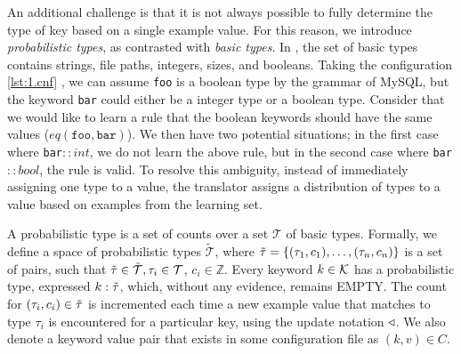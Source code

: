 An additional challenge is that it is not always possible to fully determine the type of key based on a single example value. 
For this reason, we introduce \textit{probabilistic types}, as contrasted with \textit{basic types}.
In \app, the set of basic types contains strings, file paths, integers, sizes, and booleans. 
Taking the configuration \ref{lst:1.cnf} , we can assume {\tt foo} is a boolean type by the grammar of MySQL,
  but the keyword {\tt bar} could either be a integer type or a boolean type.
Consider that we would like to learn a rule that the boolean keywords should have the same values ($eq(\texttt{foo},\texttt{bar})$).
We then have two potential situations; in the first case where {\tt bar}$::int$, we do not learn the above rule, but in the second case where {\tt bar}$::bool$, the rule is valid.
To resolve this ambiguity, instead of immediately assigning one type to a value, the translator assigns a distribution of types to a value based on examples from the learning set.

A probabilistic type is a set of counts over a set $\mathcal{T}$ of basic types.
Formally, we define a space of probabilistic types $\tilde{\mathcal{T}}$, where $\tilde{\tau}=\{(\tau_1, c_1),\ldots,(\tau_n, c_n)\}$ is a set of pairs, such that $\tilde{\tau} \in \tilde{\mathcal{T}}, \tau_i \in \mathcal{T}$, $c_i \in \mathbb{Z}$. 
Every keyword $k\in\mathcal{K}$ has a probabilistic type, expressed $k:\tilde{\tau}$, which, without any evidence, remains {\scriptsize EMPTY}.
The count for $(\tau_i,c_i) \in \tilde{\tau}$ is incremented each time a new example value that matches to type $\tau_i$ is encountered for a particular key, using the update notation $\triangleleft$.
We also denote a keyword value pair that exists in some configuration file as $(k,v) \in C$.

